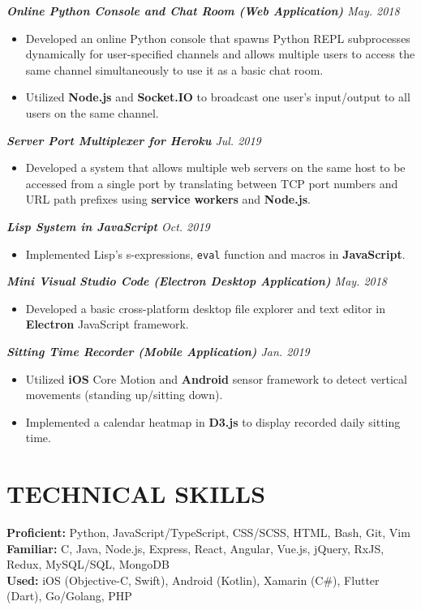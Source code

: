 \documentclass[10pt]{article}
\begin{document}
%
{\itshape {\bfseries Online Python Console and Chat Room (Web Application)}  \hfill May. 2018}
\begin{itemize}[leftmargin=15pt, noitemsep, topsep=0pt]
\item Developed an online Python console that spawns Python REPL subprocesses dynamically for user-specified channels and allows multiple users to access the same channel simultaneously to use it as a basic chat room.
\item Utilized \textbf{Node.js} and \textbf{Socket.IO} to broadcast one user’s input/output to all users on the same channel.
\end{itemize}
\vspace{0.5em}
%
{\itshape {\bfseries Server Port Multiplexer for Heroku}  \hfill Jul. 2019}
\begin{itemize}[leftmargin=15pt, noitemsep, topsep=0pt]
\item Developed a system that allows multiple web servers on the same host to be accessed from a single port by translating between TCP port numbers and URL path prefixes using \textbf{service workers} and \textbf{Node.js}. 
\end{itemize}
\vspace{0.2em}
%
{\itshape {\bfseries Lisp System in JavaScript}  \hfill Oct. 2019}
\begin{itemize}[leftmargin=15pt, noitemsep, topsep=0pt]
\item Implemented Lisp's s-expressions, \texttt{eval} function and macros in \textbf{JavaScript}.
\end{itemize}
\vspace{0.2em}
%
{\itshape {\bfseries Mini Visual Studio Code (Electron Desktop Application)}  \hfill May. 2018}
\begin{itemize}[leftmargin=15pt, noitemsep, topsep=0pt]
\item Developed a basic cross-platform desktop file explorer and text editor in \textbf{Electron} JavaScript framework.
\end{itemize}
\vspace{0.2em}
%
{\itshape {\bfseries Sitting Time Recorder (Mobile Application)}  \hfill Jan. 2019}
\begin{itemize}[leftmargin=15pt, noitemsep, topsep=0pt]
\item Utilized \textbf{iOS} Core Motion and \textbf{Android} sensor framework to detect vertical movements (standing up/sitting down).
\item Implemented a calendar heatmap in \textbf{D3.js} to display recorded daily sitting time.
\end{itemize}
%
\vspace{-0.5em}
\section*{TECHNICAL SKILLS}
\textbf{Proficient:} Python, JavaScript/TypeScript, CSS/SCSS, HTML, Bash, Git, Vim\\
\textbf{Familiar:} C, Java, Node.js, Express, React, Angular, Vue.js, jQuery, RxJS, Redux, MySQL/SQL, MongoDB\\
\textbf{Used:} iOS (Objective-C, Swift), Android (Kotlin), Xamarin (C\#), Flutter (Dart), Go/Golang, PHP
\end{document}
